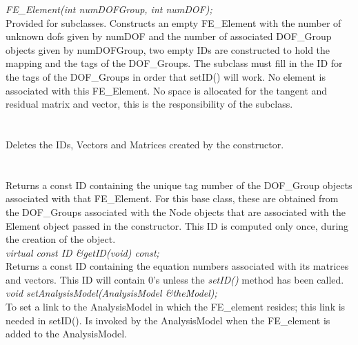 {\em FE\_Element(int numDOFGroup, int numDOF);}  \\
Provided for subclasses. Constructs an empty FE\_Element with the
number of unknown dofs given by \p numDOF and the number of
associated DOF\_Group objects given by \p numDOFGroup, two empty IDs
are constructed to hold the mapping and the tags of the
DOF\_Groups. The subclass must fill in the ID for the tags of the
DOF\_Groups in order that setID() will work. No element is
associated with this FE\_Element. No space is allocated for the
tangent and residual matrix and vector, this is the responsibility of
the subclass. \\  

  \\
  \\
Deletes the IDs, Vectors and Matrices created by the constructor. \\

  \\
 \\
Returns a const ID containing the unique tag number of the
DOF\_Group objects associated with that FE\_Element. For this base class,
these are obtained from the DOF\_Groups associated with the Node objects
that are associated with the Element object passed in the constructor. This
ID is computed only once, during the creation of the object. \\

{\em virtual const ID \&getID(void) const;} \\
Returns a const ID containing the equation numbers associated with its
matrices and vectors. This ID will contain $0$'s unless the {\em
setID()} method has been called.\\

{\em void setAnalysisModel(AnalysisModel \&theModel);} \\
To set a link to the AnalysisModel in which the FE\_element
resides; this link is needed in setID(). Is invoked by the
AnalysisModel when the FE\_element is added to the AnalysisModel. \\


